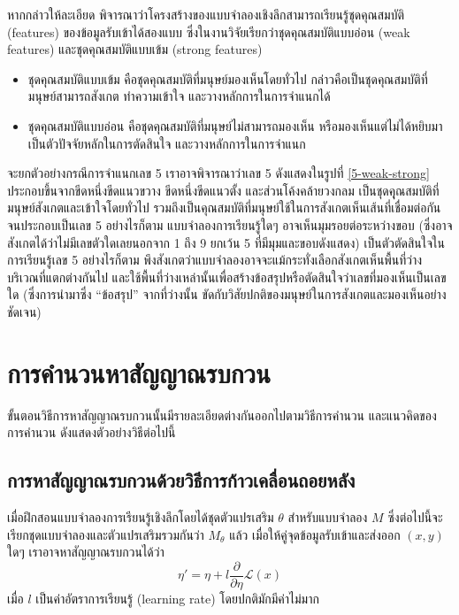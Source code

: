 หากกล่าวให้ละเอียด พิจารณาว่าโครงสร้างของแบบจำลองเชิงลึกสามารถเรียนรู้ชุดคุณสมบัติ (features) ของข้อมูลรับเข้าได้สองแบบ ซึ่งในงานวิจัยเรียกว่าชุดคุณสมบัติแบบอ่อน (weak features) และชุดคุณสมบัติแบบเข้ม (strong features)

\begin{itemize}
    \item ชุดคุณสมบัติแบบเข้ม คือชุดคุณสมบัติที่มนุษย์มองเห็นโดยทั่วไป กล่าวคือเป็นชุดคุณสมบัติที่มนุษย์สามารถสังเกต ทำความเข้าใจ และวางหลักการในการจำแนกได้
    \item ชุดคุณสมบัติแบบอ่อน คือชุดคุณสมบัติที่มนุษย์ไม่สามารถมองเห็น หรือมองเห็นแต่ไม่ได้หยิบมาเป็นตัวปัจจัยหลักในการตัดสินใจ และวางหลักการในการจำแนก
\end{itemize}

จะยกตัวอย่างกรณีการจำแนกเลข 5 เราอาจพิจารณาว่าเลข 5 ดังแสดงในรูปที่ \ref{5-weak-strong} ประกอบขึ้นจากขีดหนึ่งขีดแนวขวาง ขีดหนึ่งขีดแนวตั้ง และส่วนโค้งคล้ายวงกลม เป็นชุดคุุณสมบัติที่มนุษย์สังเกตและเข้าใจโดยทั่วไป รวมถึงเป็นคุณสมบัติที่มนุษย์ใช้ในการสังเกตเห็นเส้นที่เชื่อมต่อกันจนประกอบเป็นเลข 5 อย่างไรก็ตาม แบบจำลองการเรียนรู้ใดๆ อาจเห็นมุมรอยต่อระหว่างขอบ (ซึ่งอาจสังเกตได้ว่าไม่มีเลขตัวใดเลยนอกจาก 1 ถึง 9 ยกเว้น 5 ที่มีมุมและขอบดังแสดง) เป็นตัวตัดสินใจในการเรียนรู้เลข 5 อย่างไรก็ตาม พึงสังเกตว่าแบบจำลองอาจจะแม้กระทั่งเลือกสังเกตเห็นพื้นที่ว่างบริเวณที่แตกต่างกันไป และใช้พื้นที่ว่างเหล่านั้นเพื่อสร้างข้อสรุปหรือตัดสินใจว่าเลขที่มองเห็นเป็นเลขใด (ซึ่งการนำมาซึ่ง ``ข้อสรุป'' จากที่ว่างนั้น ขัดกับวิสัยปกติของมนุษย์ในการสังเกตและมองเห็นอย่างชัดเจน)

\section{การคำนวนหาสัญญาณรบกวน}

ขั้นตอนวิธีการหาสัญญาณรบกวนนั้นมีรายละเอียดต่างกันออกไปตามวิธีการคำนวน และแนวคิดของการคำนวน ดังแสดงตัวอย่างวิธีต่อไปนี้

\subsection{การหาสัญญาณรบกวนด้วยวิธีการก้าวเคลื่อนถอยหลัง}
เมื่อฝึกสอนแบบจำลองการเรียนรู้เชิงลึกโดยได้ชุดตัวแปรเสริม $\theta$ สำหรับแบบจำลอง $M$ ซึ่งต่อไปนี้จะเรียกชุดแบบจำลองและตัวแปรเสริมรวมกันว่า $M_\theta$ แล้ว เมื่อให้คู่จุดข้อมูลรับเข้าและส่งออก $(x, y)$ ใดๆ เราอาจหาสัญญาณรบกวนได้ว่า
\begin{equation}
    \eta' = \eta + l \frac{\partial}{\partial \eta} \mathscr{L}\left( x \right)
    \label{adver-gradient-descent}
\end{equation}
เมื่อ $l$ เป็นค่าอัตราการเรียนรู้ (learning rate) โดยปกติมักมีค่าไม่มาก

